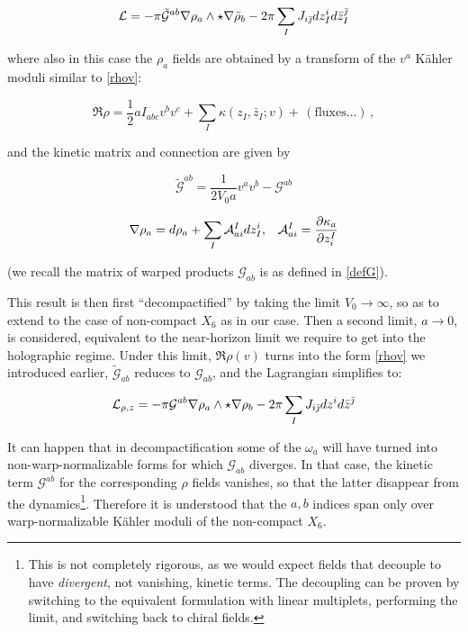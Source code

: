 \begin{equation}
	\mathcal{L} = - \pi \tilde{\mathcal{G}}^{ab} \nabla \rho_a \wedge \star \nabla \bar\rho_b - 2\pi \sum_I J_{i\bar{\jmath}} dz_I^i d\bar z_I^{\bar\jmath}
	\label{}
\end{equation}

where also in this case the $\rho_a$ fields are obtained by a transform of the $v^a$ K\"ahler moduli similar to \eqref{rhov}:

\begin{equation}
	\Re \rho  = \frac{1}{2} a I_{abc} v^b v^c + \sum_I \kappa(z_I,\bar z_I; v) + \, (\text{fluxes}\ldots) \,,
	\label{}
\end{equation}

and the kinetic matrix and connection are given by

\begin{equation}
	\tilde{\mathcal{G}}^{ab} = \frac{1}{2V_0 a} v^a v^b - \mathcal{G}^{ab}
	\label{}
\end{equation}

\begin{align}
	\nabla \rho_a = d\rho_a + \sum_I \mathcal{A}^I_{ai} dz_I^i, && \mathcal{A}^I_{ai} = \frac{\partial\kappa_a}{\partial z^I_i}
	\label{}
\end{align}

(we recall the matrix of warped products $\mathcal{G}_{ab}$ is as defined in \eqref{defG}).

This result is then first ``decompactified'' by taking the limit $V_0 \rightarrow \infty$, so as to extend to the case of non-compact $X_6$ as in our case. Then a second limit, $a \rightarrow 0$, is considered, equivalent to the near-horizon limit we require to get into the holographic regime. Under this limit, $\Re \rho(v)$ turns into the form \eqref{rhov} we introduced earlier, $\tilde{\mathcal{G}}_{ab}$ reduces to $\mathcal{G}_{ab}$, and the Lagrangian simplifies to:

\begin{equation}
	\mathcal{L}_{\rho,z} = - \pi \mathcal{G}^{ab} \nabla \rho_a \wedge \star \nabla \rho_b - 2\pi \sum_I J_{i\bar{\jmath}} dz^i d\bar z^{\bar\jmath}
	\label{}
\end{equation}

It can happen that in decompactification some of the $\omega_a$ will have turned into non-warp-normalizable forms for which $\mathcal{G}_{ab}$ diverges. In that case, the kinetic term $\mathcal{G}^{ab}$ for the corresponding $\rho$ fields vanishes, so that the latter disappear from the dynamics\footnote{This is not completely rigorous, as we would expect fields that decouple to have \emph{divergent}, not vanishing, kinetic terms. The decoupling can be proven \cite{MZ} by switching to the equivalent formulation with linear multiplets, performing the limit, and switching back to chiral fields.}. Therefore it is understood that the $a,b$ indices span only over warp-normalizable K\"ahler moduli of the non-compact $X_6$.

